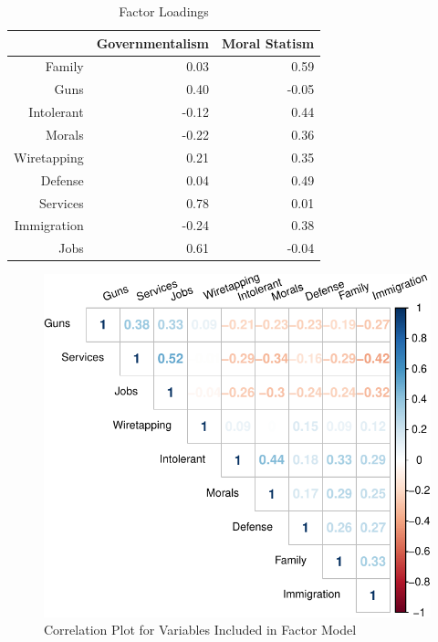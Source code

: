 \documentclass[12pt,]{article}
\begin{document}
\clearpage

\begin{table}[ht]
\centering
\begin{tabular}{rrr}
  \hline
 & Governmentalism & Moral Statism \\ 
  \hline
Family & 0.03 & 0.59 \\ 
  Guns & 0.40 & -0.05 \\ 
  Intolerant & -0.12 & 0.44 \\ 
  Morals & -0.22 & 0.36 \\ 
  Wiretapping & 0.21 & 0.35 \\ 
  Defense & 0.04 & 0.49 \\ 
  Services & 0.78 & 0.01 \\ 
  Immigration & -0.24 & 0.38 \\ 
  Jobs & 0.61 & -0.04 \\ 
   \hline
\end{tabular}
\caption{Factor Loadings} 
\label{Factor Loadings From Main Factor Analysis}
\end{table}

\begin{figure}[htbp]
\centering
\includegraphics{figures/corrplot1-1.pdf}
\caption{Correlation Plot for Variables Included in Factor Model}
\end{figure}
\end{document}
